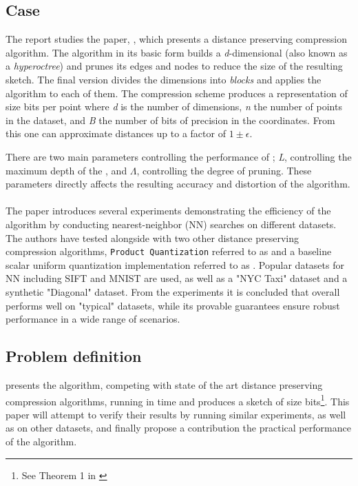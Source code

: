 \subsection{Case} %
The report studies the paper, \cite{wagner17}, which presents a distance preserving compression algorithm. The algorithm in its basic form builds a \textit{d}-dimensional \qt{}(also known as a \textit{hyperoctree}) and prunes its edges and nodes to reduce the size of the resulting sketch. The final version divides the dimensions into \textit{blocks} and applies the algorithm to each of them. The compression scheme produces a representation of size  bits per point where \textit{d} is the number of dimensions, \textit{n} the number of points in the dataset, and \textit{B} the number of bits of precision in the coordinates. From this one can approximate distances up to a factor of $1\pm\epsilon$. 

There are two main parameters controlling the performance of \qs{}; \textit{L}, controlling the maximum depth of the \qt{}, and $\Lambda$, controlling the degree of pruning. These parameters directly affects the resulting accuracy and distortion of the algorithm.
\\
\\
The paper introduces several experiments demonstrating the efficiency of the algorithm by conducting nearest-neighbor (NN) searches on different datasets. The authors have tested \qs{} alongside with two other distance preserving compression algorithms, \texttt{Product Quantization} referred to as \pq{} and a baseline scalar uniform quantization implementation referred to as \gr{}. Popular datasets for NN including SIFT and MNIST are used, as well as a "NYC Taxi" dataset and a synthetic "Diagonal" dataset. From the experiments it is concluded that \qs{} overall performs well on "typical" datasets, while its provable guarantees ensure robust performance in a wide range of scenarios\cite[p. 2, l. 38-40]{wagner17}. 

\subsection{Problem definition} %
\cite{wagner17} presents the \qs{} algorithm, competing with state of the art distance preserving compression algorithms, running in  time and produces a sketch of size  bits\footnote{See Theorem 1 in \cite[p. 3]{wagner17}}. This paper will attempt to verify their results by running similar experiments, as well as on other datasets, and finally propose a contribution the practical performance of the \qs{} algorithm.



